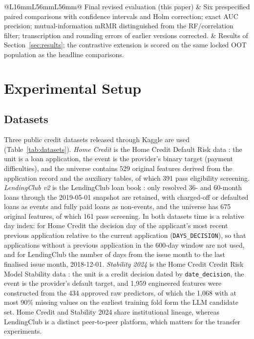 \documentclass[final,5p,twocolumn]{elsarticle}
\begin{document}
\begin{table}[htbp]
\begin{threeparttable}
\begin{tabular}{@{}L{16mm}L{56mm}L{56mm}@{}}
\addlinespace
Final revised evaluation (this paper) & Six prespecified paired comparisons with confidence intervals and Holm correction; exact AUC precision; mutual-information mRMR distinguished from the RF/correlation filter; transcription and rounding errors of earlier versions corrected. & Results of Section~\ref{sec:results}; the contrastive extension is scored on the same locked OOT population as the headline comparisons. \\
\bottomrule
\end{tabular}
\end{threeparttable}
\end{table}


\section{Experimental Setup}
\label{sec:experimental_setup}

\subsection{Datasets}
\label{subsec:datasets}

Three public credit datasets released through Kaggle are used (Table~\ref{tab:datasets}). \emph{Home Credit} is the Home Credit Default Risk data \cite{homecredit2018}: the unit is a loan application, the event is the provider's binary target (payment difficulties), and the universe contains 529 original features derived from the application record and the auxiliary tables, of which 391 pass eligibility screening. \emph{LendingClub v2} is the LendingClub loan book \cite{lendingclub_kaggle}: only resolved 36- and 60-month loans through the 2019-05-01 snapshot are retained, with charged-off or defaulted loans as events and fully paid loans as non-events, and the universe has 675 original features, of which 161 pass screening. In both datasets time is a relative day index: for Home Credit the decision day of the applicant's most recent previous application relative to the current application (\texttt{DAYS\_DECISION}), so that applications without a previous application in the 600-day window are not used, and for LendingClub the number of days from the issue month to the last finalised issue month, 2018-12-01. \emph{Stability 2024} is the Home Credit Credit Risk Model Stability data \cite{homecredit2024}: the unit is a credit decision dated by \texttt{date\_decision}, the event is the provider's default target, and 1,959 engineered features were constructed from the 434 approved raw predictors, of which the 1,068 with at most 90\% missing values on the earliest training fold form the LLM candidate set. Home Credit and Stability 2024 share institutional lineage, whereas LendingClub is a distinct peer-to-peer platform, which matters for the transfer experiments.
\end{document}
